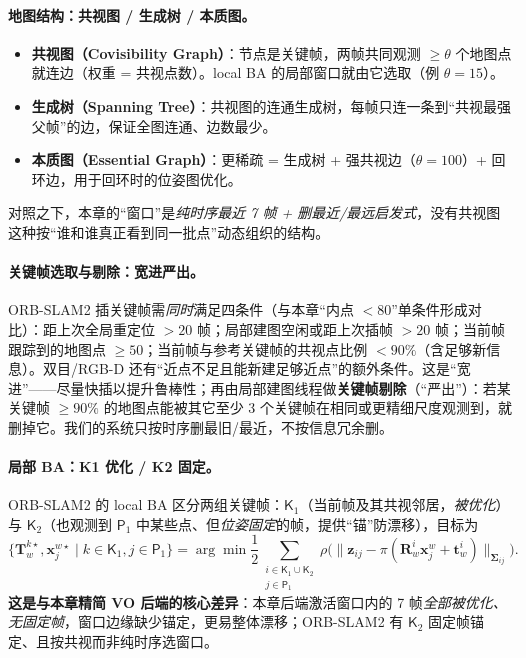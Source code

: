 \paragraph{地图结构：共视图 / 生成树 / 本质图。}
\begin{itemize}
  \item \textbf{共视图（Covisibility Graph）}\cite{murartal2015orbslam}：节点是关键帧，两帧共同观测 $\ge\theta$ 个地图点就连边（权重 = 共视点数）。local BA 的局部窗口就由它选取（例 $\theta=15$）。
  \item \textbf{生成树（Spanning Tree）}：共视图的连通生成树，每帧只连一条到“共视最强父帧”的边，保证全图连通、边数最少。
  \item \textbf{本质图（Essential Graph）}：更稀疏 = 生成树 + 强共视边（$\theta=100$）+ 回环边，用于回环时的位姿图优化。
\end{itemize}
对照之下，本章的“窗口”是\emph{纯时序最近 7 帧 + 删最近/最远启发式}，没有共视图这种按“谁和谁真正看到同一批点”动态组织的结构。

\paragraph{关键帧选取与剔除：宽进严出。}
ORB-SLAM2 插关键帧需\emph{同时}满足四条件（与本章“内点 $<80$”单条件形成对比）：距上次全局重定位 $>20$ 帧；局部建图空闲或距上次插帧 $>20$ 帧；当前帧跟踪到的地图点 $\ge50$；当前帧与参考关键帧的共视点比例 $<90\%$（含足够新信息）。双目/RGB-D 还有“近点不足且能新建足够近点”的额外条件。这是“宽进”——尽量快插以提升鲁棒性；再由局部建图线程做\textbf{关键帧剔除}（“严出”）：若某关键帧 $\ge90\%$ 的地图点能被其它至少 3 个关键帧在相同或更精细尺度观测到，就删掉它。我们的系统只按时序删最旧/最近，不按信息冗余删。

\paragraph{局部 BA：K1 优化 / K2 固定。}
ORB-SLAM2 的 local BA 区分两组关键帧：$\mathsf{K}_1$（当前帧及其共视邻居，\emph{被优化}）与 $\mathsf{K}_2$（也观测到 $\mathsf{P}_1$ 中某些点、但\emph{位姿固定}的帧，提供“锚”防漂移），目标为
\begin{equation}
\big\{\mathbf{T}_w^{k\star},\mathbf{x}_j^{w\star}\mid k\in\mathsf{K}_1, j\in\mathsf{P}_1\big\}
=\arg\min\frac12\!\!\sum_{\substack{i\in\mathsf{K}_1\cup\mathsf{K}_2\\ j\in\mathsf{P}_1}}\!\!
\rho\Big(\big\|\mathbf{z}_{ij}-\pi(\mathbf{R}_w^i\mathbf{x}_j^w+\mathbf{t}_w^i)\big\|_{\boldsymbol\Sigma_{ij}}\Big).
\label{eq:sys-orb-localba}
\end{equation}
\textbf{这是与本章精简 VO 后端的核心差异}：本章后端激活窗口内的 7 帧\emph{全部被优化、无固定帧}，窗口边缘缺少锚定，更易整体漂移；ORB-SLAM2 有 $\mathsf{K}_2$ 固定帧锚定、且按共视而非纯时序选窗口。

